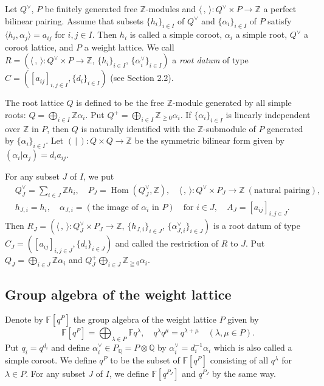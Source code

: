 \documentclass[12pt,a4paper]{article}
\newcommand\Hom{\mathop{\mathrm{Hom}}\nolimits}
\newcommand\bra{\langle}
\newcommand\ket{\rangle}
\newcommand\av{\alpha^\vee}
\newcommand\ah{h}
\newcommand\Qv{Q^\vee}
\newcommand\Z{{\mathbb Z}} %
\newcommand\F{{\mathbb F}} %
\newcommand\Q{{\mathbb Q}} %
\theoremstyle{plain} %
\theoremstyle{definition} %
\theoremstyle{definition} %
\numberwithin{theorem}{section}
\numberwithin{equation}{section}
\numberwithin{figure}{section}
\numberwithin{table}{section}
\begin{document}
Let $\Qv$, $P$ be finitely generated free $\Z$-modules 
and $\bra\,,\,\ket:\Qv\times P\to\Z$ a perfect bilinear pairing.
Assume that subsets $\{\ah_i\}_{i\in I}$ of $\Qv$ 
and $\{\alpha_i\}_{i\in I}$ of $P$ 
satisfy $\bra\ah_i,\alpha_j\ket=a_{ij}$ for $i,j\in I$.
Then $\ah_i$ is called a simple coroot, 
$\alpha_i$ a simple root, 
$\Qv$ a coroot lattice, 
and $P$ a weight lattice.
We call
$R=(\bra\,,\,\ket:\Qv\times P\to\Z,\,\{\ah_i\}_{i\in I},\,\{\av_i\}_{i\in I})$ 
a {\em root datum} of type $C=([a_{ij}]_{i,j\in I},\{d_i\}_{i\in I})$ 
(see \cite{lusztig-book} Section 2.2).

The root lattice $Q$ is defined to be 
the free $\Z$-module generated by all simple roots:
$Q=\bigoplus_{i\in I}\Z\alpha_i$.
Put $Q^+=\bigoplus_{i\in I}\Z_{\geqq0}\alpha_i$.
If $\{\alpha_i\}_{i\in I}$ is linearly independent over $\Z$ in $P$,
then $Q$ is naturally identified with the $\Z$-submodule of $P$
generated by $\{\alpha_i\}_{i\in I}$.
Let $(\,|\,):Q\times Q\to\Z$ be the symmetric bilinear form 
given by $(\alpha_i|\alpha_j)=d_ia_{ij}$.

For any subset $J$ of $I$, we put
\begin{align*}
 &
 \Qv_J = \sum_{i\in J}\Z\ah_i, \quad
 P_J = \Hom(\Qv_J,\Z), \quad
 \bra\,,\,\ket:\Qv\times P_J\to\Z\ (\text{natural pairing}), 
 \\ &
 \ah_{J,i} = \ah_i, \quad
 \alpha_{J,i} = (\text{the image of $\alpha_i$ in $P$})
 \quad \text{for $i\in J$},
 \quad
 A_J = [a_{ij}]_{i,j\in J}.
\end{align*}
Then 
$R_J=(\bra\,,\,\ket:\Qv_J\times P_J\to\Z,\,\{\ah_{J,i}\}_{i\in J},\,\{\av_{J,i}\}_{i\in J})$ 
is a root datum of type $C_J=([a_{ij}]_{i,j\in J},\{d_i\}_{i\in J})$
and called the restriction of $R$ to $J$.
Put $Q_J=\bigoplus_{i\in J}\Z\alpha_i$ 
and $Q_J^+\bigoplus_{i\in J}\Z_{\geqq0}\alpha_i$.

\subsection{Group algebra of the weight lattice}

Denote by $\F[q^P]$ the group algebra of the weight lattice $P$ given by
\begin{equation*}
 \F[q^P] = \bigoplus_{\lambda\in P}\F q^\lambda, \quad
 q^\lambda q^\mu = q^{\lambda+\mu} \quad
 (\lambda,\mu\in P).
\end{equation*}
Put $q_i=q^{d_i}$ and 
define $\av_i\in P_\Q=P\otimes\Q$ by $\av_i = d_i^{-1}\alpha_i$
which is also called a simple coroot.
We define $q^P$ to be the subset of $\F[q^P]$ consisting of
all $q^\lambda$ for $\lambda\in P$.
For any subset $J$ of $I$, 
we define $\F[q^{P_J}]$ and $q^{P_J}$ by the same way.
\end{document}
